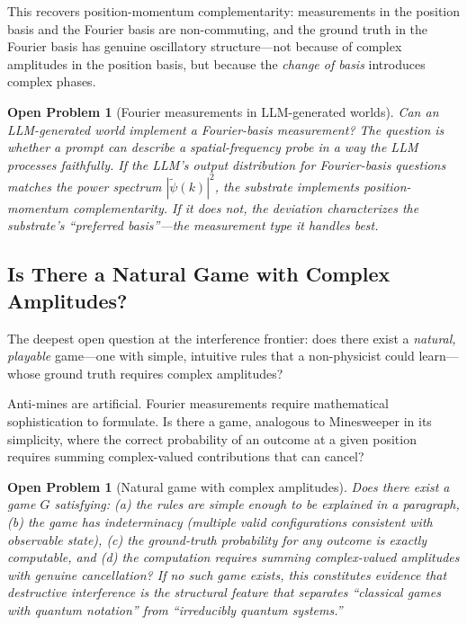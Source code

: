 \documentclass[12pt,a4paper]{article}
\newtheorem{openproblem}[theorem]{Open Problem}
\theoremstyle{definition}
\theoremstyle{remark}
\begin{document}
This recovers position-momentum complementarity: measurements in the position basis and the Fourier basis are non-commuting, and the ground truth in the Fourier basis has genuine oscillatory structure---not because of complex amplitudes in the position basis, but because the \emph{change of basis} introduces complex phases.

\begin{openproblem}[Fourier measurements in LLM-generated worlds]
\label{op:fourier}
Can an LLM-generated world implement a Fourier-basis measurement?  The question is whether a prompt can describe a spatial-frequency probe in a way the LLM processes faithfully.  If the LLM's output distribution for Fourier-basis questions matches the power spectrum $|\tilde{\psi}(k)|^2$, the substrate implements position-momentum complementarity.  If it does not, the deviation characterizes the substrate's ``preferred basis''---the measurement type it handles best.
\end{openproblem}

\subsection{Is There a Natural Game with Complex Amplitudes?}

The deepest open question at the interference frontier: does there exist a \emph{natural, playable} game---one with simple, intuitive rules that a non-physicist could learn---whose ground truth requires complex amplitudes?

Anti-mines are artificial.  Fourier measurements require mathematical sophistication to formulate.  Is there a game, analogous to Minesweeper in its simplicity, where the correct probability of an outcome at a given position requires summing complex-valued contributions that can cancel?

\begin{openproblem}[Natural game with complex amplitudes]
\label{op:natural-game}
Does there exist a game $G$ satisfying: (a) the rules are simple enough to be explained in a paragraph, (b) the game has indeterminacy (multiple valid configurations consistent with observable state), (c) the ground-truth probability for any outcome is exactly computable, and (d) the computation requires summing complex-valued amplitudes with genuine cancellation?  If no such game exists, this constitutes evidence that destructive interference is the structural feature that separates ``classical games with quantum notation'' from ``irreducibly quantum systems.''
\end{openproblem}
\end{document}
